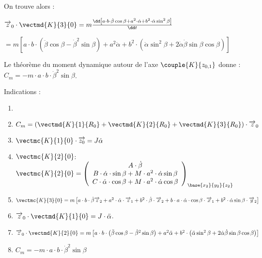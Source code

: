 \begin{multicols}{2}
\begin{corrige}
On trouve alors : 

$
\overrightarrow{z}_0\cdot \vectmd{K}{3}{0}=
m\frac{\dd\left[a\cdot b\cdot \dot{\beta}\cos\beta+a^2\cdot \dot{\alpha}+b^2\cdot \dot{\alpha}\sin^2\beta\right]}{\dd t}
$

$=m\left[a\cdot b\cdot \left(\ddot{\beta}\cos\beta-\dot{\beta}^2\sin\beta\right)+a^2\ddot{\alpha}+b^2\cdot\left(\ddot{\alpha}\sin^2\beta+2\dot{\alpha}\dot{\beta}\sin\beta\cos\beta\right)\right]
$

\end{corrige}
\else
\fi



\ifprof
\begin{corrige}
Le théorème du moment dynamique autour de l'axe $\couple{K}{{z}_{0,1}}$ donne :
$
C_m=-m\cdot a\cdot b\cdot \dot{\beta}^2\sin\beta
$.

\end{corrige}
\else
\fi



Indications : 
\begin{enumerate}
\item 
\item $C_m=\left(\vectmd{K}{1}{R_0}+\vectmd{K}{2}{R_0}+\vectmd{K}{3}{R_0}\right)\cdot \overrightarrow{z}_0$
\item  $ \vectmc{K}{1}{0}\cdot\overrightarrow{z_0} = J \dot{\alpha}$
\item  $\vectmc{K}{2}{0}$: $
\vectmc{K}{2}{0}=\left(
\begin{array}{c}
A\cdot \dot{\beta}\\
B\cdot \dot{\alpha}\cdot \sin\beta+M\cdot a^2\cdot \dot{\alpha}\sin\beta\\
C\cdot \dot{\alpha}\cdot \cos\beta+M\cdot a^2\cdot \dot{\alpha}\cos\beta\\
\end{array}
\right)_{\base{{x}_2}{{y}_2}{{z}_2}}\\
$
\item $
\vectmc{K}{3}{0}=m\left[a\cdot b\cdot\dot{\beta} \overrightarrow{z}_2+a^2\cdot \dot{\alpha}\cdot\overrightarrow{z}_1+b^2\cdot \dot{\beta}\cdot\overrightarrow{x}_2+b\cdot a\cdot \dot{\alpha}\cdot \cos\beta\cdot \overrightarrow{x}_1+b^2\cdot \dot{\alpha}\sin\beta\cdot \overrightarrow{y}_2\right]
$
\item $\overrightarrow{z}_0\cdot \vectmd{K}{1}{0}=J\cdot \ddot{\alpha}$.
\item $\overrightarrow{z}_0\cdot \vectmd{K}{2}{0}=m\left[a\cdot b\cdot \left(\ddot{\beta}\cos\beta-\dot{\beta}^2\sin\beta\right)+a^2\ddot{\alpha}+b^2\cdot\left(\ddot{\alpha}\sin^2\beta+2\dot{\alpha}\dot{\beta}\sin\beta\cos\beta\right)\right]$
\item $
C_m=-m\cdot a\cdot b\cdot \dot{\beta}^2\sin\beta
$
\end{enumerate}
\ifprof
\else
\end{multicols}
\fi

